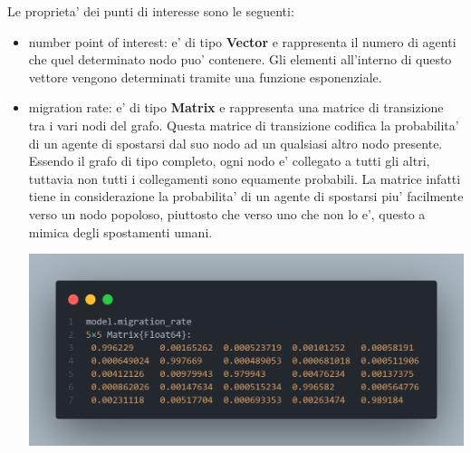 Le proprieta' dei punti di interesse sono le seguenti:
\begin{itemize}
	\item number point of interest: e' di tipo \textbf{Vector} e rappresenta il numero di agenti 
	che quel determinato nodo puo' contenere. Gli elementi all'interno di questo vettore vengono 
	determinati tramite una funzione esponenziale.
	\item migration rate: e' di tipo \textbf{Matrix} e rappresenta una matrice di transizione tra i 
	vari nodi del grafo. Questa matrice di transizione codifica la probabilita' di un agente di spostarsi
	dal suo nodo ad un qualsiasi altro nodo presente. Essendo il grafo di tipo completo, ogni nodo 
	e' collegato a tutti gli altri, tuttavia non tutti i collegamenti sono equamente probabili.
	La matrice infatti tiene in considerazione la probabilita' di un agente di spostarsi piu' 
	facilmente verso un nodo popoloso, piuttosto che verso uno che non lo e', questo a mimica degli 
	spostamenti umani.

	\begin{minipage}{\linewidth}
		\centering
		\includegraphics[width=\textwidth]{img/travel_rate.png}
		\label{fig:migration_matrix}
	\end{minipage}


\end{itemize}
